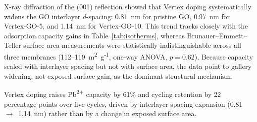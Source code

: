 X-ray diffraction of the (001) reflection showed that Vertex doping systematically widens the GO interlayer $d$-spacing: 0.81~nm for pristine GO, 0.97~nm for Vertex-GO-5, and 1.14~nm for Vertex-GO-10. This trend tracks closely with the adsorption capacity gains in Table~\ref{tab:isotherms}, whereas Brunauer--Emmett--Teller surface-area measurements were statistically indistinguishable across all three membranes (112--119~m\textsuperscript{2}~g\textsuperscript{-1}, one-way ANOVA, $p = 0.62$). Because capacity scaled with interlayer spacing but not with surface area, the data point to gallery widening, not exposed-surface gain, as the dominant structural mechanism.

\begin{keyfindings}
Vertex doping raises Pb\textsuperscript{2+} capacity by 61\% and cycling retention by 22 percentage points over five cycles, driven by interlayer-spacing expansion (0.81~$\rightarrow$~1.14~nm) rather than by a change in exposed surface area.
\end{keyfindings}
